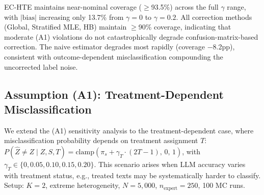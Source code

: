 \begin{table}[h]
\centering
\caption{Sensitivity to Assumption~(A1) violation. Coverage and $|\text{bias}|$ under outcome-dependent misclassification ($\gamma > 0$).}
\label{tab:a1_sensitivity}
\small
{}
\end{table}

EC-HTE maintains near-nominal coverage ($\geq$93.5\%) across the full $\gamma$ range, with $|\text{bias}|$ increasing only 13.7\% from $\gamma{=}0$ to $\gamma{=}0.2$.
All correction methods (Global, Stratified MLE, HB) maintain $\geq$90\% coverage, indicating that moderate (A1) violations do not catastrophically degrade confusion-matrix-based correction.
The naive estimator degrades most rapidly (coverage $-$8.2pp), consistent with outcome-dependent misclassification compounding the uncorrected label noise.

\subsection{Assumption (A1): Treatment-Dependent Misclassification}
\label{app:treatment_dep}

We extend the (A1) sensitivity analysis to the treatment-dependent case, where misclassification probability depends on treatment assignment $T$: $P(\hat{Z}{\neq}Z \mid Z, S, T) = \mathrm{clamp}(\pi_s + \gamma_T \cdot (2T - 1),\, 0,\, 1)$, with $\gamma_T \in \{0, 0.05, 0.10, 0.15, 0.20\}$.
This scenario arises when LLM accuracy varies with treatment status, e.g., treated texts may be systematically harder to classify.
Setup: $K{=}2$, extreme heterogeneity, $N{=}5{,}000$, $n_{\text{expert}}{=}250$, 100 MC runs.

